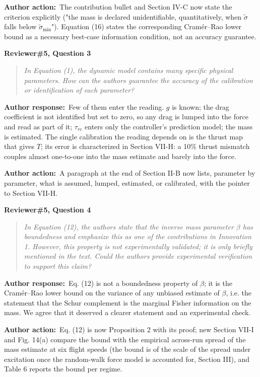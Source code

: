 \documentclass[11pt]{article}
\newcommand{\concern}[1]{\par\medskip\noindent\colorbox{gray!12}{\parbox{\dimexpr\linewidth-2\fboxsep}{\textbf{#1}}}\par\smallskip}
\newcommand{\rlabel}[1]{\par\textbf{#1}\ }
\begin{document}
\rlabel{Author action:}The contribution bullet and Section IV-C now state the criterion explicitly ("the mass is declared unidentifiable, quantitatively, when $\tilde\sigma$ falls below $\tilde\sigma_{\min}$"). Equation (16) states the corresponding Cram\'er--Rao lower bound as a necessary best-case information condition, not an accuracy guarantee.

\concern{Reviewer\#5, Question 3}

\begin{quote}\itshape In Equation (1), the dynamic model contains many specific physical parameters. How can the authors guarantee the accuracy of the calibration or identification of each parameter?\end{quote}

\rlabel{Author response:}Few of them enter the reading. $g$ is known; the drag coefficient is not identified but set to zero, so any drag is lumped into the force and read as part of it; $\tau_{rc}$ enters only the controller's prediction model; the mass is estimated. The single calibration the reading depends on is the thrust map that gives $T$; its error is characterized in Section VII-H: a 10\% thrust mismatch couples almost one-to-one into the mass estimate and barely into the force.

\rlabel{Author action:}A paragraph at the end of Section II-B now lists, parameter by parameter, what is assumed, lumped, estimated, or calibrated, with the pointer to Section VII-H.

\concern{Reviewer\#5, Question 4}

\begin{quote}\itshape In Equation (12), the authors state that the inverse mass parameter $\beta$ has boundedness and emphasize this as one of the contributions in Innovation 1. However, this property is not experimentally validated; it is only briefly mentioned in the text. Could the authors provide experimental verification to support this claim?\end{quote}

\rlabel{Author response:}Eq. (12) is not a boundedness property of $\beta$; it is the Cram\'er--Rao lower bound on the variance of any unbiased estimate of $\beta$, i.e. the statement that the Schur complement is the marginal Fisher information on the mass. We agree that it deserved a clearer statement and an experimental check.

\rlabel{Author action:}Eq. (12) is now Proposition 2 with its proof; new Section VII-I and Fig. 14(a) compare the bound with the empirical across-run spread of the mass estimate at six flight speeds (the bound is of the scale of the spread under excitation once the random-walk force model is accounted for, Section III), and Table 6 reports the bound per regime.
\end{document}
